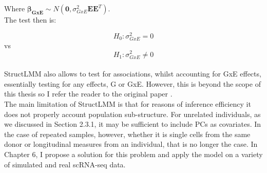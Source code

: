 Where $\boldsymbol{\beta_{GxE}} \sim N(\mathbf{0}, \sigma^2_{GxE}\mathbf{E}\mathbf{E}^T)$.\\

The test then is:

\begin{equation}
 H_{0}: \sigma^2_{GxE}=0 
\end{equation}
vs
\begin{equation}
 H_{1}: \sigma^2_{GxE} \neq 0 
\end{equation}\\

StructLMM also allows to test for associations, whilst accounting for GxE effects, essentially testing for any effects, G or GxE.
However, this is beyond the scope of this thesis so I refer the reader to the original paper \cite{moore2019linear}.\\

The main limitation of StructLMM is that for reasons of inference efficiency it does not properly account population sub-structure.
For unrelated individuals, as we discussed in Section 2.3.1, it may be sufficient to include PCs as covariates.
In the case of repeated samples, however, whether it is single cells from the same donor or longitudinal measures from an individual, that is no longer the case.
In Chapter 6, I propose a solution for this problem and apply the model on a variety of simulated and real scRNA-seq data.



